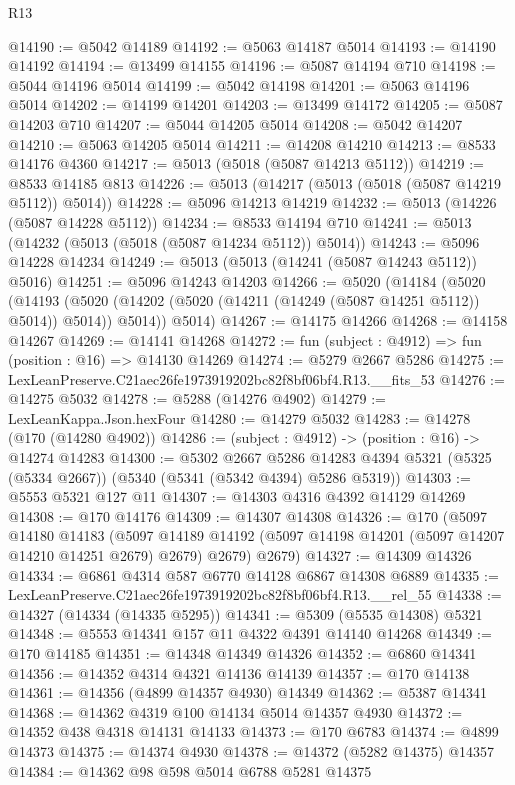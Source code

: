 \begin{lexlean}{R13}
\begin{coremodule}
@14190 := @5042 @14189
@14192 := @5063 @14187 @5014
@14193 := @14190 @14192
@14194 := @13499 @14155
@14196 := @5087 @14194 @710
@14198 := @5044 @14196 @5014
@14199 := @5042 @14198
@14201 := @5063 @14196 @5014
@14202 := @14199 @14201
@14203 := @13499 @14172
@14205 := @5087 @14203 @710
@14207 := @5044 @14205 @5014
@14208 := @5042 @14207
@14210 := @5063 @14205 @5014
@14211 := @14208 @14210
@14213 := @8533 @14176 @4360
@14217 := @5013 (@5018 (@5087 @14213 @5112))
@14219 := @8533 @14185 @813
@14226 := @5013 (@14217 (@5013 (@5018 (@5087 @14219 @5112)) @5014))
@14228 := @5096 @14213 @14219
@14232 := @5013 (@14226 (@5087 @14228 @5112))
@14234 := @8533 @14194 @710
@14241 := @5013 (@14232 (@5013 (@5018 (@5087 @14234 @5112)) @5014))
@14243 := @5096 @14228 @14234
@14249 := @5013 (@5013 (@14241 (@5087 @14243 @5112)) @5016)
@14251 := @5096 @14243 @14203
@14266 := @5020
    (@14184
      (@5020
        (@14193 (@5020 (@14202 (@5020 (@14211 (@14249 (@5087 @14251 @5112)) @5014)) @5014)) @5014))
      @5014)
@14267 := @14175 @14266
@14268 := @14158 @14267
@14269 := @14141 @14268
@14272 := fun (subject : @4912) => fun (position : @16) => @14130 @14269
@14274 := @5279 @2667 @5286
@14275 := LexLeanPreserve.C21aec26fe1973919202bc82f8bf06bf4.R13.__fits_53
@14276 := @14275 @5032
@14278 := @5288 (@14276 @4902)
@14279 := LexLeanKappa.Json.hexFour
@14280 := @14279 @5032
@14283 := @14278 (@170 (@14280 @4902))
@14286 := (subject : @4912) -> (position : @16) -> @14274 @14283
@14300 := @5302
    @2667
    @5286
    @14283
    @4394
    @5321
    (@5325 (@5334 @2667))
    (@5340 (@5341 (@5342 @4394) @5286 @5319))
@14303 := @5553 @5321 @127 @11
@14307 := @14303 @4316 @4392 @14129 @14269
@14308 := @170 @14176
@14309 := @14307 @14308
@14326 := @170
    (@5097
      @14180
      @14183
      (@5097 @14189 @14192 (@5097 @14198 @14201 (@5097 @14207 @14210 @14251 @2679) @2679) @2679)
      @2679)
@14327 := @14309 @14326
@14334 := @6861 @4314 @587 @6770 @14128 @6867 @14308 @6889
@14335 := LexLeanPreserve.C21aec26fe1973919202bc82f8bf06bf4.R13.__rel_55
@14338 := @14327 (@14334 (@14335 @5295))
@14341 := @5309 (@5535 @14308) @5321
@14348 := @5553 @14341 @157 @11 @4322 @4391 @14140 @14268
@14349 := @170 @14185
@14351 := @14348 @14349 @14326
@14352 := @6860 @14341
@14356 := @14352 @4314 @4321 @14136 @14139
@14357 := @170 @14138
@14361 := @14356 (@4899 @14357 @4930) @14349
@14362 := @5387 @14341
@14368 := @14362 @4319 @100 @14134 @5014 @14357 @4930
@14372 := @14352 @438 @4318 @14131 @14133
@14373 := @170 @6783
@14374 := @4899 @14373
@14375 := @14374 @4930
@14378 := @14372 (@5282 @14375) @14357
@14384 := @14362 @98 @598 @5014 @6788 @5281 @14375

\end{coremodule}
\end{lexlean}
